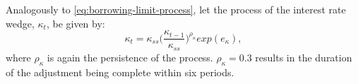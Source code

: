 \documentclass[12pt]{article} %
\numberwithin{equation}{section} %
\numberwithin{figure}{section}
\numberwithin{table}{section}
\begin{document}
Analogously to \eqref{eq:borrowing-limit-process}, let the process of the interest rate wedge, $\kappa_t$, be given by:
\begin{equation}
    \kappa_t = \kappa_{ss} \Bigg( \frac{\kappa_{t-1}}{\kappa_{ss}} \Bigg)^{\rho_{\kappa}} exp(e_{\kappa}), \label{eq:wedge-process}
\end{equation}
where $\rho_{\kappa}$ is again the persistence of the process. $\rho_{\kappa} = 0.3$ results in the duration of the adjustment being complete within six periods. 



\end{document}
